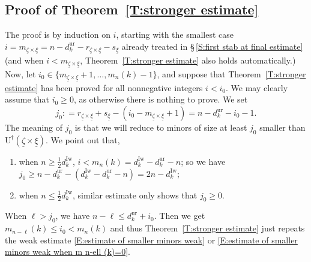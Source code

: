 \documentclass[12pt]{amsart}
\theoremstyle{definition}
\numberwithin{equation}{subsection}
\def\rmU{\mathrm{U}}
\newcommand{\Iw}{\mathrm{Iw}}
\newcommand{\ur}{\mathrm{ur}}
\begin{document}
\subsection{Proof of Theorem~\ref{T:stronger estimate}}
\label{S:proof of statement stronger estimate}
The proof is
by induction on $i$, starting with the smallest case $i = m_{\underline \zeta \times \underline \xi}=  n-d_k^\ur - r_{\underline \zeta \times \underline \xi} - s_{\underline \xi}$ already treated in \S\,\ref{S:first stab at final estimate} (and when $i< m_{\underline \zeta \times \underline \xi}$, Theorem~\ref{T:stronger estimate} also holds automatically.) 
Now, let $i_0 \in \{m_{\underline \zeta \times \underline \xi}+1, \dots, m_n(k)-1\}$, and suppose that Theorem~\ref{T:stronger estimate} has been proved for all nonnegative integers $i<i_0$. We may clearly assume that $i_0 \geq 0$, as otherwise there is nothing to prove.
We set
$$
j_0: = r_{\underline \zeta \times \underline \xi} + s_{\underline \xi} - (i_0-m_{\underline \zeta \times \underline \xi}+1) = n-d_k^\ur -i_0-1.
$$
The meaning of $j_0$ is that we will reduce to minors of size at least $j_0$ smaller than $\rmU^\dagger(\underline \zeta \times \underline \xi)$. We point out that, 
\begin{enumerate}
\item when $n \geq \frac 12d_k^\Iw$, $i < m_n(k) = d_k^\Iw - d_k^\ur - n$; so we have $j_0 \geq n-d_k^\ur - (d_k^\Iw - d_k^\ur - n) = 2n-d_k^\Iw$;
\item when $n \leq \frac 12d_k^\Iw$, similar estimate only shows that $j_0 \geq 0$.
\end{enumerate}
When $\ell > j_0$, we have $n-\ell\leq d_k^\ur+i_0$. Then we get $ m_{n-\ell}(k)\leq i_0<m_n(k)$ and thus Theorem~\ref{T:stronger estimate} just repeats the weak estimate \eqref{E:estimate of smaller minors weak} or \eqref{E:estimate of smaller minors weak when m n-ell (k)=0}. 
\end{document}
